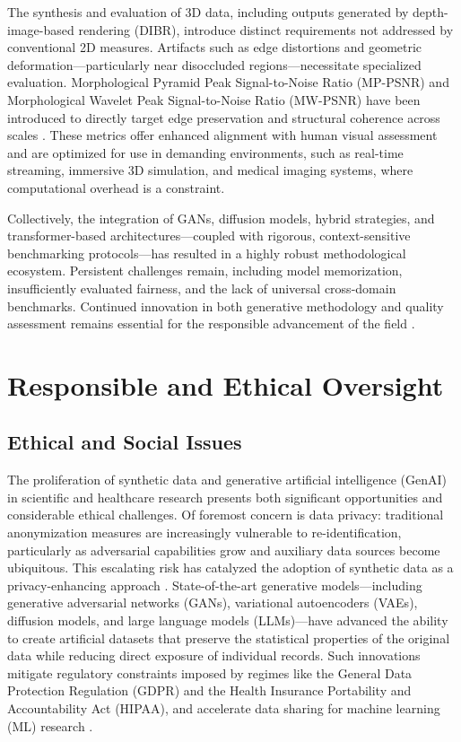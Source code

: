 \documentclass[sigconf]{acmart}
\begin{document}
The synthesis and evaluation of 3D data, including outputs generated by depth-image-based rendering (DIBR), introduce distinct requirements not addressed by conventional 2D measures. Artifacts such as edge distortions and geometric deformation—particularly near disoccluded regions—necessitate specialized evaluation. Morphological Pyramid Peak Signal-to-Noise Ratio (MP-PSNR) and Morphological Wavelet Peak Signal-to-Noise Ratio (MW-PSNR) have been introduced to directly target edge preservation and structural coherence across scales \cite{ref99}. These metrics offer enhanced alignment with human visual assessment and are optimized for use in demanding environments, such as real-time streaming, immersive 3D simulation, and medical imaging systems, where computational overhead is a constraint.

Collectively, the integration of GANs, diffusion models, hybrid strategies, and transformer-based architectures—coupled with rigorous, context-sensitive benchmarking protocols—has resulted in a highly robust methodological ecosystem. Persistent challenges remain, including model memorization, insufficiently evaluated fairness, and the lack of universal cross-domain benchmarks. Continued innovation in both generative methodology and quality assessment remains essential for the responsible advancement of the field \cite{ref87}\cite{ref88}\cite{ref89}\cite{ref90}\cite{ref93}\cite{ref95}\cite{ref101}\cite{ref102}.

\section{Responsible and Ethical Oversight}

\subsection{Ethical and Social Issues}

The proliferation of synthetic data and generative artificial intelligence (GenAI) in scientific and healthcare research presents both significant opportunities and considerable ethical challenges. Of foremost concern is data privacy: traditional anonymization measures are increasingly vulnerable to re-identification, particularly as adversarial capabilities grow and auxiliary data sources become ubiquitous. This escalating risk has catalyzed the adoption of synthetic data as a privacy-enhancing approach \cite{ref8}\cite{ref12}\cite{ref14}\cite{ref16}\cite{ref18}. State-of-the-art generative models—including generative adversarial networks (GANs), variational autoencoders (VAEs), diffusion models, and large language models (LLMs)—have advanced the ability to create artificial datasets that preserve the statistical properties of the original data while reducing direct exposure of individual records. Such innovations mitigate regulatory constraints imposed by regimes like the General Data Protection Regulation (GDPR) and the Health Insurance Portability and Accountability Act (HIPAA), and accelerate data sharing for machine learning (ML) research \cite{ref1}\cite{ref3}\cite{ref7}\cite{ref11}\cite{ref13}\cite{ref14}\cite{ref16}\cite{ref21}.
\end{document}
